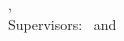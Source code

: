 \hfill
\vfill
{
	\small
	\textbf{\thesisName} \\
	\textit{\thesisTitle} \\
	\thesisSubject, \thesisDate \\
	Supervisors: \thesisFirstSupervisor\ and \thesisSecondSupervisor \\[1.5em]
	\textbf{\thesisUniversity} \\
	\textit{\thesisUniversityGroup} \\
	\thesisUniversityDepartment \\
	\thesisUniversityCity
}
